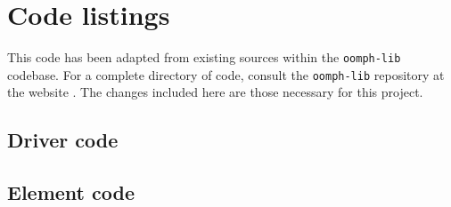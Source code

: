 \documentclass[12pt,MSc,twoside]{muthesis}
\def \oomph {\texttt{oomph-lib} }
\begin{document}
\ifdefined\nopreamble
\else
	 
\fi











\appendix
\chapter{Code listings}

This code has been adapted from existing sources within the \oomph codebase.
For a complete directory of code, consult the \oomph repository at the website \cite{oomph}.
The changes included here are those necessary for this project.

\section{Driver code}


\clearpage
\section{Element code}

\end{document}
